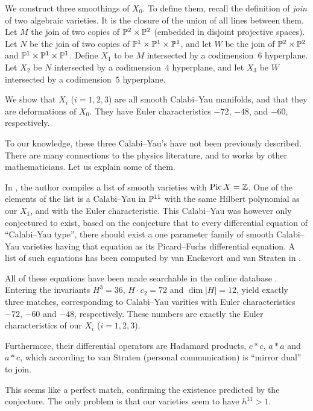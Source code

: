 We construct three smoothings of $X_0$. To define them, recall the definition of \emph{join} of two algebraic varieties. It is the closure of the union of all lines between them. Let $M$ the join of two copies of $\P^2 \times \P^2$ (embedded in disjoint projective spaces). Let $N$ be the join of two copies of $\P^1 \times \P^1 \times \P^1$, and let $W$ be the join of $\P^2 \times \P^2$ and $\P^1 \times \P^1 \times \P^1$. Define $X_1$ to be $M$ intersected by a codimension~$6$ hyperplane. Let $X_2$ be $N$ intersected by a codimension~$4$ hyperplane, and let $X_3$ be $W$ intersected by a codimension~$5$ hyperplane. 

We show that $X_i$ ($i=1,2,3$) are all smooth Calabi--Yau manifolds, and that they are deformations of $X_0$. They have Euler characteristics $-72$, $-48$, and $-60$, respectively. 

To our knowledge, these three Calabi--Yau's have not been previously described. There are many connections to the physics literature, and to works by other mathematicians. Let us explain some of them.

In \cite{kapustka_delpezzo}, the author compiles a list of smooth \CY varieties with $\Pic X = \Z$. One of the elements of the list is a Calabi--Yau in $\P^{11}$ with the same Hilbert polynomial as our $X_1$, and with the Euler characteristic. This Calabi--Yau was however only conjectured to exist, based on the conjecture that to every differential equation of ``Calabi--Yau type'', there should exist a one parameter family of smooth Calabi--Yau varieties having that equation as its Picard--Fuchs differential equation. A list of such equations has been computed by van Enckevort and van Straten in \cite{monodromy_straten}.

All of these equations have been made searchable in the online database \cite{cy_database}. Entering the invariants $H^3=36$, $H \cdot c_2 = 72$ and $\dim |H|=12$, yield exactly three matches, corresponding to Calabi--Yau varities with Euler characteristics $-72$, $-60$ and $-48$, respectively. These numbers are exactly the Euler characteristics of our $X_i$ ($i=1,2,3$).

Furthermore, their differential operators are Hadamard products, $c \ast c$, $a \ast a$ and $a \ast c$, which according to van Straten (personal communication) is ``mirror dual'' to join.

This seems like a perfect match, confirming the existence predicted by the conjecture. The only problem is that our varieties seem to have $h^{11} > 1$.

